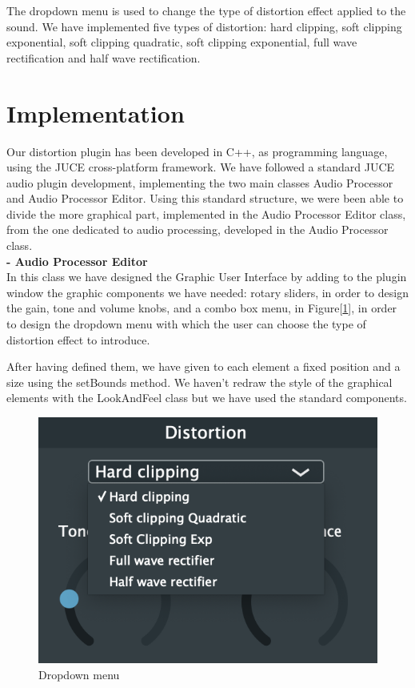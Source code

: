 \documentclass[letterpaper, 12pt]{article}
\begin{document}
	The dropdown menu is used to change the type of distortion effect applied to the sound. We have implemented five types of distortion: hard clipping, soft clipping exponential, soft clipping quadratic, soft clipping exponential, full wave rectification and half wave rectification.
	
	\section{Implementation}
	
	Our distortion plugin has been developed in C++, as programming language, using the JUCE cross-platform framework. We have followed a standard JUCE audio plugin development, implementing the two main classes Audio Processor and Audio Processor Editor. 
	Using this standard structure, we were been able to divide the more graphical part, implemented in the Audio Processor Editor class, from the one dedicated to audio processing, developed in the Audio Processor class.
	\\
	
	\textbf{-	Audio Processor Editor} 
\\
	
	In this class we have designed the Graphic User Interface by adding to the plugin window the graphic components we have needed: rotary sliders, in order to design the gain, tone and volume knobs, and a combo box menu, in Figure[\ref{fig:combobox}], in order to design the dropdown menu with which the user can choose the type of distortion effect to introduce.
	
	After having defined them, we have given to each element a fixed position and a size using the setBounds method.
	We haven’t redraw the style of the graphical elements with the LookAndFeel class but we have used the standard components.
	\\
	
	\begin{figure}[h!]
		\includegraphics[scale=0.6]{combobox.png}
		\centering
		\caption{Dropdown menu}
		\label{fig:combobox}
	\end{figure}
\end{document}
